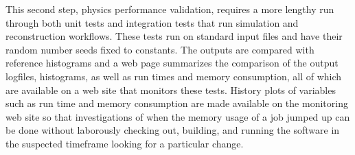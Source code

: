 This second step, physics performance validation, requires a more lengthy run through both unit tests and integration tests that run simulation and reconstruction workflows.  These tests run on standard input files and have their random number seeds fixed to constants.  The outputs are compared with reference histograms and a web page summarizes the comparison of the output logfiles, histograms, as well as run times and memory consumption, all of which are available on a web site that monitors these tests.  History plots of variables such as run time and memory consumption are made available on the monitoring web site so that investigations of when the memory usage of a job jumped up can be done without laborously checking out, building, and running the software in the suspected timeframe looking for a particular change.
